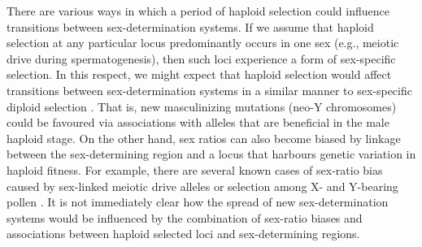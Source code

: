 \documentclass[12pt]{article}
\begin{document}
There are various ways in which a period of haploid selection could influence transitions between sex-determination systems. 
If we assume that haploid selection at any particular locus predominantly occurs in one sex (e.g., meiotic drive during spermatogenesis), then such loci experience a form of sex-specific selection. 
In this respect, we might expect that haploid selection would affect transitions between sex-determination systems in a similar manner to sex-specific diploid selection \citep[as explored by][]{vanDoorn:2007eu,vanDoorn:2010hu}. 
That is, new masculinizing mutations (neo-Y chromosomes) could be favoured via associations with alleles that are beneficial in the male haploid stage. 
On the other hand, sex ratios can also become biased by linkage between the sex-determining region and a locus that harbours genetic variation in haploid fitness. 
For example, there are several known cases of sex-ratio bias caused by sex-linked meiotic drive alleles \citep[][Chapter 3]{Burt:2006} or selection among X- and Y-bearing pollen \citep{Lloyd:1974tz,Conn:1981uw,Stehlik:2005ul,Stehlik:2006to,Field:2012fd,Field:2013cc}. 
It is not immediately clear how the spread of new sex-determination systems would be influenced by the combination of sex-ratio biases and associations between haploid selected loci and sex-determining regions. 

\end{document}
